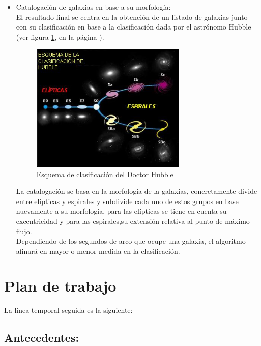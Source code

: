 \begin{itemize}
		\item Catalogación de galaxias en base a su morfología:\\
		El resultado final se centra en la obtención de un listado de galaxias
		junto con su clasificación en base a la clasificación dada por el
		astrónomo Hubble (ver figura \ref{fig:HubbleClasification}, en la página \pageref{fig:HubbleClasification}).\\
		\begin{figure}[!htb]
			\centering
			\includegraphics[width=0.7\textwidth]{images/EsquemaHubble.jpg}
			\caption{\label{fig:HubbleClasification}Esquema de clasificación del Doctor Hubble}
		\end{figure}
		La catalogación se basa en la morfología de la galaxias, concretamente
		divide entre elípticas y espirales y subdivide cada uno de estos
		grupos en base nuevamente a su morfología, para las elípticas se tiene
		en cuenta su excentricidad y para las espirales,su extensión relativa al
		punto de máximo flujo.\\
		Dependiendo de los segundos de arco que ocupe una galaxia, el algoritmo
		afinará en mayor o menor medida en la clasificación.
	\end{itemize}	

	\vfill

	\section{Plan de trabajo}
	
	La linea temporal seguida es la siguiente:
	
	\subsection{Antecedentes: }
	
